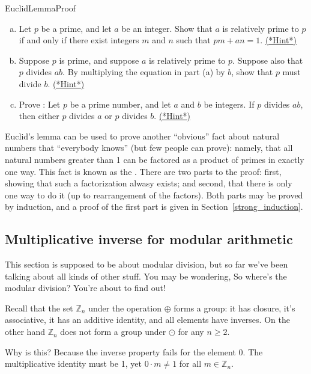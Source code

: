 \begin{exercise}{EuclidLemmaProof}
\begin{enumerate}[(a)]
\item
Let  $p$ be a prime, and let  $a$ be an integer.  Show that $a$ is relatively prime to $p$  if and only if there exist integers $m$ and $n$ such that $pm + an=1$.
\hyperref[sec:modular_arithmetic:hints]{(*Hint*)}
\item
Suppose $p$ is prime, and suppose $a$ is relatively prime to $p$.  Suppose also that $p$ divides $ab$. By multiplying the equation in part (a) by $b$, show that $p$ must divide $b$.
\hyperref[sec:modular_arithmetic:hints]{(*Hint*)}
\item
Prove :  Let $p$ be a prime number, and let $a$ and $b$ be integers. If $p$ divides $ab$, then either $p$ divides $a$ or $p$ divides $b$.
\hyperref[sec:modular_arithmetic:hints]{(*Hint*)}
\end{enumerate}
\end{exercise}

Euclid's lemma can be used to prove another ``obvious'' fact about natural numbers that ``everybody knows'' (but few people can prove): namely, that all natural numbers greater than 1 can be factored as a product of primes in exactly one way. This fact is known as the . There are two parts to the proof: first, showing that such a factorization alwasy exists; and second, that there is only  one way to do it (up to rearrangement of the factors).  Both parts may be proved by induction, and a proof of the first part is given in Section~\ref{strong_induction}.

\subsection{Multiplicative inverse for modular arithmetic\label{subsec:MultInve}}
This section is supposed to be about modular division, but so far we've been talking about all kinds of other stuff. You may be wondering, So where's the modular division? You're about to find out!

Recall that the set $\mathbb{Z}_n$ under the operation $\oplus$ forms a group:  
it has closure, it's associative, it has an additive identity, and all elements have inverses.  On the other hand $\mathbb{Z}_n$ does not form a group under $\odot$ for any $n \ge 2$.  


Why is this? Because the inverse property fails for the element 0. The multiplicative identity must be 1, yet $0\cdot m \neq 1$ for all $m\in \mathbb{Z}_n$.

